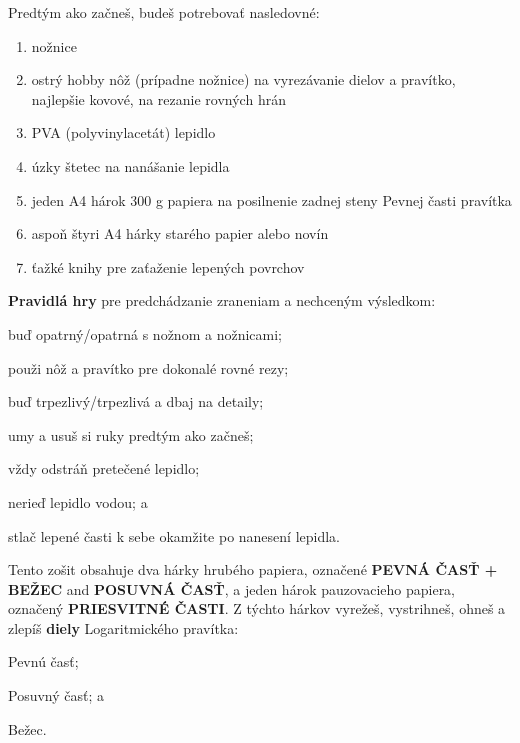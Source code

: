   \begin{multicols*}{3}
  \normalsize{Predtým ako začneš, budeš potrebovať nasledovné:
    \begin{enumerate}
      \setlength{\parskip}{0pt}
      \setlength{\parsep}{0pt}
      \item nožnice
      \item ostrý hobby nôž (prípadne nožnice) na vyrezávanie dielov a pravítko, najlepšie kovové, na rezanie rovných hrán
      \item PVA (polyvinylacetát) lepidlo
      \item úzky štetec na nanášanie lepidla
      \item jeden A4 hárok 300 g papiera na posilnenie zadnej steny Pevnej časti pravítka
      \item aspoň štyri A4 hárky starého papier alebo novín
      \item ťažké knihy pre zaťaženie lepených povrchov
    \end{enumerate}

  \textbf{Pravidlá hry} pre predchádzanie zraneniam a nechceným výsledkom:
    \begin{inparaenum}
      \item buď opatrný/opatrná s nožnom a nožnicami;
      \item použi nôž a pravítko pre dokonalé rovné rezy;
      \item buď trpezlivý/trpezlivá a dbaj na detaily;
      \item umy a usuš si ruky predtým ako začneš;
      \item vždy odstráň pretečené lepidlo;
      \item nerieď lepidlo vodou; a
      \item stlač lepené časti k sebe okamžite po nanesení lepidla.
    \end{inparaenum}

  Tento zošit obsahuje dva hárky hrubého papiera, označené \textbf{PEVNÁ ČASŤ + BEŽEC} and \textbf{POSUVNÁ ČASŤ}, a jeden hárok pauzovacieho papiera, označený \textbf{PRIESVITNÉ ČASTI}. Z týchto hárkov vyrežeš, vystrihneš, ohneš a zlepíš \textbf{diely} Logaritmického pravítka:
    \begin{inparaenum}
      \item Pevnú časť;
      \item Posuvný časť; a
      \item Bežec.
    \end{inparaenum}

}
\end{multicols*}
